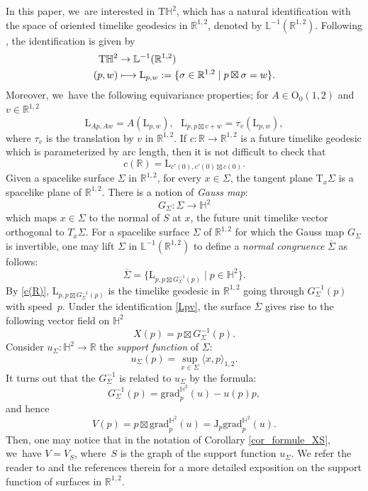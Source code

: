 \documentclass[10pt]{amsart}
\newcommand\mto{\mathchoice{\longmapsto}{\mapsto}{\mapsto}{\mapsto}}
\theoremstyle{plain}
\theoremstyle{definition}
\newcommand{\minko}{\mathbb{R}^{1,2}}
\newcommand{\grad}{\mathrm{grad}^{\mathbb{H}^2}}
\newcommand{\J}{\mathrm{J}}
\newcommand{\inner}[1] {\langle #1 \rangle}
\begin{document}
In this paper, we~are interested in $\mathrm{T}\mathbb{H}^2$, which has a natural identification with the space of oriented timelike geodesics in $\minko$, denoted by $\mathbb{L}^{-1}(\minko)$. Following \cite[\S 6.6]{DGK_complete_lorentz}, the identification is given by
\begin{equation}\label{Lpv}
\begin{aligned}
\mathrm{T}\mathbb{H}^2 & \to \mathbb{L}^{-1}(\minko) \\
(p,w) & \mto \mathrm{L}_{p,w}:=\{\sigma\in\minko \mid p\boxtimes\sigma=w\}.
\end{aligned}
\end{equation}
Moreover, we~have the following equivariance properties; for $A\in \mathrm{O}_0(1,2)$ and $v\in\minko$
\begin{equation}
\mathrm{L}_{Ap,Aw}=A(\mathrm{L}_{p,w}),\ \ \ \mathrm{L}_{p,p\boxtimes v+w}=\tau_v(\mathrm{L}_{p,w}),
\end{equation} where $\tau_v$ is the translation by $v$ in $\minko$.
If $c:\mathbb{R}\to\minko$ is a future timelike geodesic which is parameterized by arc length, then it is not difficult to check that
\begin{equation}\label{c(R)}
c(\mathbb{R})=\mathrm{L}_{c'(0),c'(0)\boxtimes c(0)}.
\end{equation}
Given a spacelike surface $\Sigma$ in $\minko$, \ie for every $x\in\Sigma$, the tangent plane $\mathrm{T}_x\Sigma$ is a spacelike plane of $\minko$. There is a notion of \emph{Gauss map}:
\[
G_{\Sigma}:\Sigma\to\mathbb{H}^2
\]
which maps $x\in\Sigma$ to the normal of $S$ at $x$, \ie the future unit timelike vector orthogonal to $T_x\Sigma$. For a spacelike surface $\Sigma$ of $\minko$ for which the Gauss map $G_{\Sigma}$ is invertible, one may lift $\Sigma$ in $\mathbb{L}^{-1}(\minko)$ to define a \emph{normal congruence} $\overline{\Sigma}$ as follows:
\begin{equation}
\overline{\Sigma}=\{\mathrm{L}_{p,p\boxtimes G^{-1}_{\Sigma}(p)}\mid p\in\mathbb{H}^2\}.
\end{equation}
By \eqref{c(R)}, $\mathrm{L}_{p,p\boxtimes G^{-1}_{\Sigma}(p)}$ is the timelike geodesic in $\minko$ going through $G_{\Sigma}^{-1}(p)$ with speed~$p$.
Under the identification \eqref{Lpv}, the surface $\overline{\Sigma}$ gives rise to the following vector field on $\mathbb{H}^2$
\[
X(p)=p\boxtimes G_{\Sigma}^{-1}(p).
\]
Consider $u_{\Sigma}:\mathbb{H}^2\to\mathbb{R}$ the \emph{support function} of $\Sigma$:
\[
u_{\Sigma}(p)=\sup_{x\in\Sigma}\inner{x,p}_{1,2}.
\]It turns out that the $G_{\Sigma}^{-1}$ is related to $u_{\Sigma}$ by the formula:
\[
G_{\Sigma}^{-1}(p)=\grad_p(u)-u(p)p,
\]
and hence
\[
V(p)=p\boxtimes \grad_p(u)=\J_p\grad_p(u).
\]
Then, one may notice that in the notation of Corollary \ref{cor_formule_XS}, we~have $V=V_S$, where~$S$ is the graph of the support function $u_{\Sigma}$.
We refer the reader to \cite{BS17} and the references therein for a more detailed exposition on the support function of surfaces in $\minko$.
\end{document}
